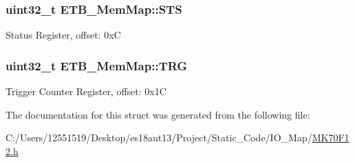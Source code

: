 \subsubsection[{S\+T\+S}]{\setlength{\rightskip}{0pt plus 5cm}uint32\+\_\+t E\+T\+B\+\_\+\+Mem\+Map\+::\+S\+T\+S}\label{struct_e_t_b___mem_map_a5a471e968aca953fb748c16b10d56939}
Status Register, offset\+: 0x\+C \hypertarget{struct_e_t_b___mem_map_a96dc184cb9f6ea6ba7b299b05c58d4ed}{}
\subsubsection[{T\+R\+G}]{\setlength{\rightskip}{0pt plus 5cm}uint32\+\_\+t E\+T\+B\+\_\+\+Mem\+Map\+::\+T\+R\+G}\label{struct_e_t_b___mem_map_a96dc184cb9f6ea6ba7b299b05c58d4ed}
Trigger Counter Register, offset\+: 0x1\+C 

The documentation for this struct was generated from the following file\+:\begin{DoxyCompactItemize}
\item 
C\+:/\+Users/12551519/\+Desktop/es18aut13/\+Project/\+Static\+\_\+\+Code/\+I\+O\+\_\+\+Map/\hyperlink{_m_k70_f12_8h}{M\+K70\+F12.\+h}\end{DoxyCompactItemize}
